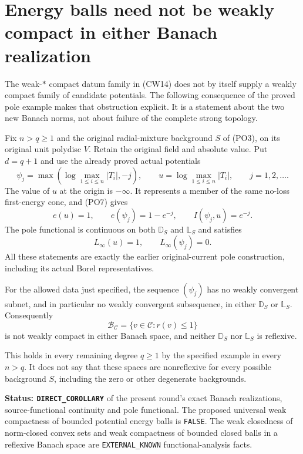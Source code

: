 \section{Energy balls need not be weakly compact in either Banach realization}
\label{sec:r12-energy-ball-weak-compactness-obstruction}

The weak-$*$ compact datum family in (CW14) does not by itself
supply a weakly compact family of candidate potentials. The
following consequence of the proved pole example makes that
obstruction explicit. It is a statement about the two new
Banach norms, not about failure of the complete strong topology.

Fix $n>q\geq1$ and the original radial-mixture background
$S$ of (PO3), on its original unit polydisc $V$. Retain the
original field and absolute value. Put $d=q+1$ and use the
already proved actual potentials
\[
 \psi_j=\max\!\left(\log\max_{1\leq i\leq n}|T_i|,-j\right),
 \qquad
 u=\log\max_{1\leq i\leq n}|T_i|,
                    \qquad j=1,2,\ldots .
 \tag{WB1}
\]
The value of $u$ at the origin is $-\infty$. It represents
a member of the same no-loss first-energy cone, and (PO7)
gives
\[
       e(u)=1,\qquad e(\psi_j)=1-e^{-j},\qquad
                               I(\psi_j,u)=e^{-j}.
 \tag{WB2}
\]
The pole functional is continuous on both $\mathbb D_S$
and $\mathbb L_S$ and satisfies
\[
                   L_\infty(u)=1,\qquad L_\infty(\psi_j)=0.
 \tag{WB3}
\]
All these statements are exactly the earlier original-current
pole construction, including its actual Borel representatives.

\begin{proposition}
\label{prop:r12-energy-ball-nonreflexivity}
For the allowed data just specified, the sequence $(\psi_j)$
has no weakly convergent subnet, and in particular no weakly
convergent subsequence, in either $\mathbb D_S$ or
$\mathbb L_S$. Consequently
\[
      \mathcal B_{\mathscr C}
            =\{v\in\mathscr C:r(v)\leq1\}
 \tag{WB4}
\]
is not weakly compact in either Banach space, and neither
$\mathbb D_S$ nor $\mathbb L_S$ is reflexive.

This holds in every remaining degree $q\geq1$ by the
specified example in every $n>q$. It does not say that
these spaces are nonreflexive for every possible background
$S$, including the zero or other degenerate backgrounds.
\end{proposition}

\noindent\textbf{Status: \texttt{DIRECT\_COROLLARY}} of
the present round's exact Banach realizations, source-functional
continuity and pole functional. The proposed universal weak
compactness of bounded potential energy balls is
\texttt{FALSE}. The weak closedness of norm-closed convex
sets and weak compactness of bounded closed balls in a
reflexive Banach space are \texttt{EXTERNAL\_KNOWN}
functional-analysis facts.

